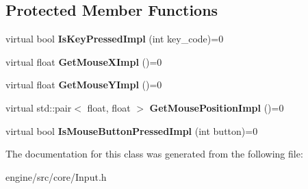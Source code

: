 \subsection*{Protected Member Functions}
\begin{DoxyCompactItemize}
\item
\mbox{\label{classengine_1_1Input_a296cc17bac6e2ebc45d178c3c06c0d63}}
virtual bool {\bfseries Is\+Key\+Pressed\+Impl} (int key\+\_\+code)=0
\item
\mbox{\label{classengine_1_1Input_ad9b92c2cccac4db3431bed2143326329}}
virtual float {\bfseries Get\+Mouse\+X\+Impl} ()=0
\item
\mbox{\label{classengine_1_1Input_a490d05f204808bdae219da6d1b03eb12}}
virtual float {\bfseries Get\+Mouse\+Y\+Impl} ()=0
\item
\mbox{\label{classengine_1_1Input_a0d98b07560fa833c7a482341e6c76dbc}}
virtual std\+::pair$<$ float, float $>$ {\bfseries Get\+Mouse\+Position\+Impl} ()=0
\item
\mbox{\label{classengine_1_1Input_a9fb17f21b15540890cb69d87d3749cdd}}
virtual bool {\bfseries Is\+Mouse\+Button\+Pressed\+Impl} (int button)=0
\end{DoxyCompactItemize}


The documentation for this class was generated from the following file\+:\begin{DoxyCompactItemize}
\item
engine/src/core/Input.\+h\end{DoxyCompactItemize}

